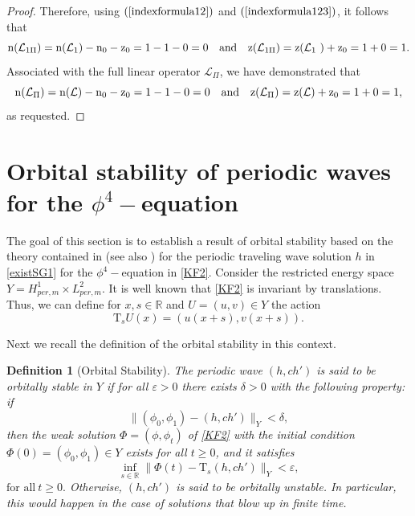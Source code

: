 \documentclass[12pt,reqno,a4paper]{amsart} %
\numberwithin{equation}{section}
\numberwithin{figure}{section}
\newtheorem{definition}[theorem]{Definition}
\begin{document}
\begin{proof}
 
	
\indent Therefore, using $(\ref{indexformula12})$ and $(\ref{indexformula123})$, it follows that
\begin{equation*}
		{\rm{n}}(\mathcal{L}_{1\Pi}) = 	{\rm{n}}(\mathcal{L}_{1})-{\rm{n}}_0-{\rm{z}}_0=1 - 1 - 0 = 0 \quad \mbox{and}\quad  	{\rm{z}}(\mathcal{L}_{1\Pi})={\rm{z}}(\mathcal{L}_{1\ })+{\rm{z}}_0=1+0=1.
\end{equation*}
Associated with the full linear operator $\mathcal{L}_{\Pi}$, we have demonstrated that
\begin{equation*}
	 {\rm{n}}(\mathcal{L}_{\Pi})=	{\rm{n}}(\mathcal{L})-{\rm{n}}_0-{\rm{z}}_0=1-1-0=0  \quad \mbox{and}\quad  {\rm{z}}(\mathcal{L}_{\Pi})={\rm{z}}(\mathcal{L})+{\rm{z}}_0=1+0=1,
\end{equation*}  as requested.
\end{proof}






 
\section{Orbital stability of periodic waves for the  $\phi^4-$equation}\label{section5}


The goal of this section is to establish a result of orbital stability based on the  theory contained in \cite[Section 4]{Natali2015} (see also \cite{grillakis1}) for the periodic  traveling wave solution $h$ in \eqref{existSG1}  for the  $\phi^4-$equation in \eqref{KF2}.  Consider the restricted energy space $Y= H_{per,m}^1 \times L_{per,m}^2$. It is well known that \eqref{KF2} is invariant by translations. Thus, we can define for $x,s \in \mathbb{R}$ and $U=(u,v) \in Y$   the action
\begin{equation*}%
\mathrm{T}_sU(x)=(u(x+s), v(x+s)). 
\end{equation*}


Next we recall the definition of the orbital stability in this context.

\begin{definition}[Orbital Stability]\label{stadef}
The periodic wave $(h,ch')$ is said to be orbitally stable in $Y$ if for all $\varepsilon>0$ there exists $\delta>0$ with the following property: if
$$
\|(\phi_0, \phi_1)-(h, ch')\|_{Y}<\delta,
$$ 
then the weak solution $\Phi=(\phi,\phi_t)$ of \eqref{KF2} with the initial condition $\Phi(0)=(\phi_0,\phi_1)\in Y$ exists for all $t\geq0$,  and it satisfies
$$
\inf_{s \in \mathbb{R}}\big\|\Phi(t)-\mathrm{T}_s (h,ch') \big\|_Y<\varepsilon,
$$
$\mbox{for all}\ t\geq0.$ Otherwise,  $(h,ch')$ is said to be  orbitally unstable. In particular, this would happen in the case of solutions that blow up in finite time.

\end{definition}
\end{document}
